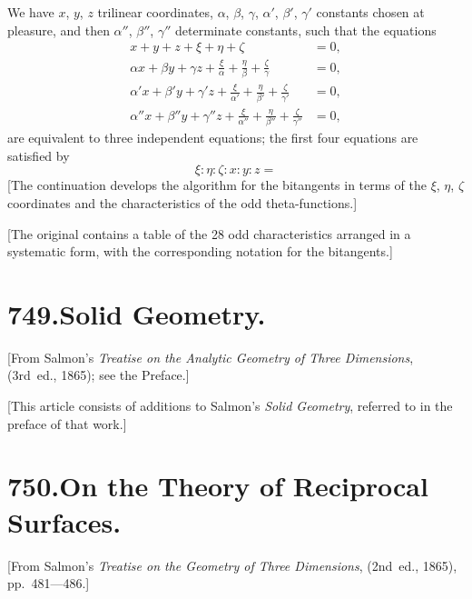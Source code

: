 \documentclass[11pt,a4paper]{book}
\begin{document}
We have $x$, $y$, $z$ trilinear coordinates, $\alpha$, $\beta$, $\gamma$, $\alpha'$, $\beta'$, $\gamma'$ constants chosen at pleasure, and then $\alpha''$, $\beta''$, $\gamma''$ determinate constants, such that the equations
\begin{align*}
x + y + z + \xi + \eta + \zeta &= 0, \\
\alpha x + \beta y + \gamma z + \frac{\xi}{\alpha} + \frac{\eta}{\beta} + \frac{\zeta}{\gamma} &= 0, \\
\alpha' x + \beta' y + \gamma' z + \frac{\xi}{\alpha'} + \frac{\eta}{\beta'} + \frac{\zeta}{\gamma'} &= 0, \\
\alpha'' x + \beta'' y + \gamma'' z + \frac{\xi}{\alpha''} + \frac{\eta}{\beta''} + \frac{\zeta}{\gamma''} &= 0,
\end{align*}
are equivalent to three independent equations; the first four equations are satisfied by
\[
\xi : \eta : \zeta : x : y : z =
\]
[The continuation develops the algorithm for the bitangents in terms of the $\xi$, $\eta$, $\zeta$ coordinates and the characteristics of the odd theta-functions.]

\medskip

[The original contains a table of the 28 odd characteristics arranged in a systematic form, with the corresponding notation for the bitangents.]


\newpage
\section*{\textbf{749.}\quad Solid Geometry.}

[From Salmon's \textit{Treatise on the Analytic Geometry of Three Dimensions}, (3rd~ed., 1865); see the Preface.]

\medskip

[This article consists of additions to Salmon's \textit{Solid Geometry}, referred to in the preface of that work.]


\newpage
\section*{\textbf{750.}\quad On the Theory of Reciprocal Surfaces.}

[From Salmon's \textit{Treatise on the Geometry of Three Dimensions}, (2nd~ed., 1865), pp.~481---486.]

\medskip
\end{document}
